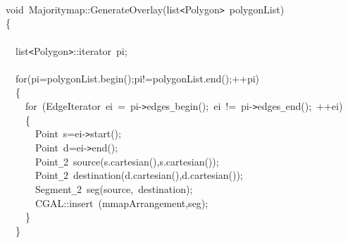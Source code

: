 {
\noindent \ttfamily
\jttstylea \\
\jttstylea \\
\jttstylea \\
\jttstylej void~\jttstylek Majoritymap::GenerateOverlay\jttstylei (\jttstylek list\verb#<#Polygon\verb#>#~polygonList\jttstylei )\\
\jttstylei \{\\
\jttstylea \\
\jttstylea ~~\jttstylek list\verb#<#Polygon\verb#>#::iterator~pi;\\
\jttstylea \\
\jttstylea ~~\jttstylee for\jttstylei (\jttstylek pi=polygonList.begin\jttstylei ()\jttstylek ;pi!=polygonList.end\jttstylei ()\jttstylek ;++pi\jttstylei )\\
\jttstylea ~~\jttstylei \{\\
\jttstylea ~~~~\jttstylee for~\jttstylei (\jttstylek EdgeIterator~ei~=~pi-\verb#>#edges\verb#_#begin\jttstylei ()\jttstylek ;~ei~!=~pi-\verb#>#edges\verb#_#end\jttstylei ()\jttstylek ;~++ei\jttstylei )\\
\jttstylea ~~~~\jttstylei \{\\
\jttstylea ~~~~~~\jttstylek Point~s=ei-\verb#>#start\jttstylei ()\jttstylek ;\\
\jttstylea ~~~~~~\jttstylek Point~d=ei-\verb#>#end\jttstylei ()\jttstylek ;\\
\jttstylea ~~~~~~\jttstylek Point\verb#_#2~source\jttstylei (\jttstylek s.cartesian\jttstylei (\jttstylei )\jttstylek ,s.cartesian\jttstylei (\jttstylei ))\jttstylek ;\\
\jttstylea ~~~~~~\jttstylek Point\verb#_#2~destination\jttstylei (\jttstylek d.cartesian\jttstylei (\jttstylei )\jttstylek ,d.cartesian\jttstylei (\jttstylei ))\jttstylek ;\\
\jttstylea ~~~~~~\jttstylek Segment\verb#_#2~seg\jttstylei (\jttstylek source,~destination\jttstylei )\jttstylek ;\\
\jttstylea ~~~~~~\jttstylek CGAL::insert~\jttstylei (\jttstylek mmapArrangement,seg\jttstylei )\jttstylek ;\\
\jttstylea ~~~~\jttstylei \}\\
\jttstylea ~~\jttstylei \}\\
}
